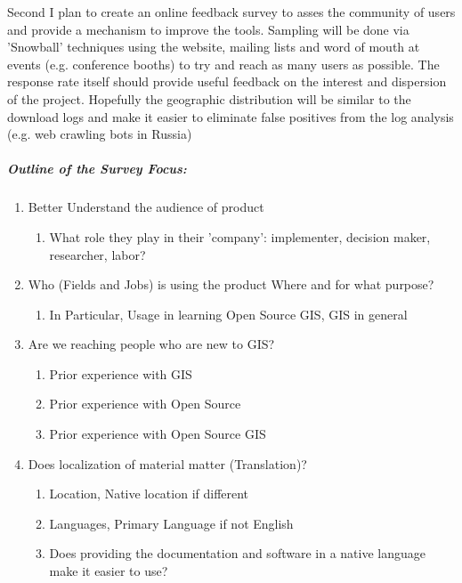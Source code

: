 \documentclass[12pt,letterpaper]{article}
\begin{document}
Second I plan to create an online feedback survey to asses the community of users and provide a mechanism to improve the tools. Sampling will be done via 'Snowball' techniques using the  website, mailing lists and word of mouth at events (e.g. conference booths) to try and reach as many users as possible. The response rate itself should provide useful feedback on the interest and dispersion of the project. Hopefully the geographic distribution will be similar to the download logs and make it easier to eliminate false positives from the log analysis (e.g. web crawling bots in Russia)

\subparagraph{Outline of the Survey Focus:}
\begin{enumerate}
\item Better Understand the audience of product
	\begin{enumerate}
		\item What role they play in their 'company': implementer, decision maker, researcher, labor?
	\end{enumerate}
\item Who (Fields and Jobs) is using the product Where and for what purpose?
	\begin{enumerate}
		\item In Particular, Usage in learning Open Source GIS, GIS in general
	\end{enumerate}
\item Are we reaching people who are new to GIS?
	\begin{enumerate}
		\item Prior experience with GIS
		\item Prior experience with Open Source
		\item Prior experience with Open Source GIS
	\end{enumerate}
\item Does localization of material matter (Translation)?	
	\begin{enumerate}
		\item Location, Native location if different
		\item Languages, Primary Language if not English
		\item Does providing the documentation and software in a native language make it easier to use?
	\end{enumerate}
\end{enumerate}
		
	
\end{document}
